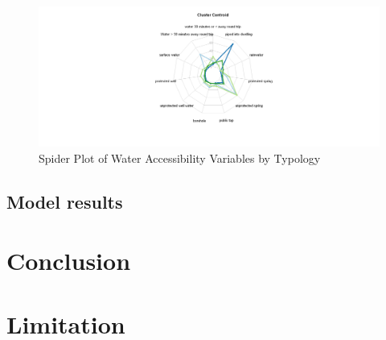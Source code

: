 \documentclass[10pt,twoside]{article}
\numberwithin{equation}{section}
\newcommand{\?}{\stackrel{?}{=}}
\begin{document}
\begin{figure}[h!]
  \centering
  \includegraphics[width=.7\textwidth]{spider-plot}
  \caption{Spider Plot of Water Accessibility Variables by Typology}
  \label{fig:spider}
\end{figure}

\subsection*{Model results}


\section*{Conclusion}

\section*{Limitation}

\printbibliography
\end{document}
